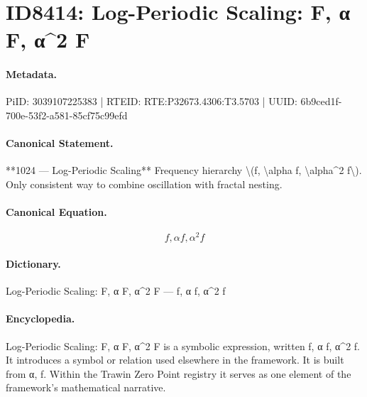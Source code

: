 \section*{ID8414: Log-Periodic Scaling: F, α F, α\textasciicircum{}2 F}
\paragraph{Metadata.}
PiID: 3039107225383 | RTEID: RTE:P32673.4306:T3.5703 | UUID: 6b9ced1f-700e-53f2-a581-85cf75c99efd

\paragraph{Canonical Statement.}
**1024 — Log-Periodic Scaling** Frequency hierarchy \textbackslash{}(f, \textbackslash{}alpha f, \textbackslash{}alpha\textasciicircum{}2 f\textbackslash{}). Only consistent way to combine oscillation with fractal nesting.

\paragraph{Canonical Equation.}
\[
f, \alpha f, \alpha^2 f
\]

\paragraph{Dictionary.}
Log-Periodic Scaling: F, α F, α\textasciicircum{}2 F — f, α f, α\textasciicircum{}2 f

\paragraph{Encyclopedia.}
Log-Periodic Scaling: F, α F, α\textasciicircum{}2 F is a symbolic expression, written f, α f, α\textasciicircum{}2 f. It introduces a symbol or relation used elsewhere in the framework. It is built from α, f. Within the Trawin Zero Point registry it serves as one element of the framework's mathematical narrative.
